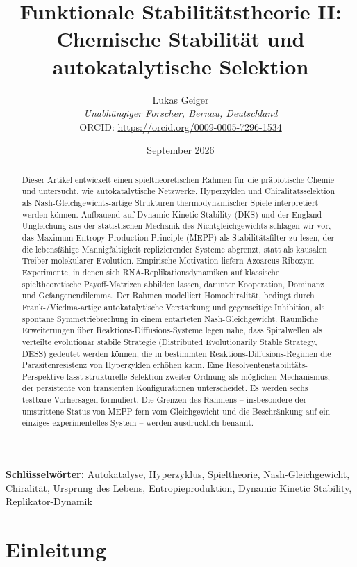 \documentclass[12pt,a4paper]{article}
\title{Funktionale Stabilitätstheorie II: Chemische Stabilität und autokatalytische Selektion}
\author{Lukas Geiger\\
\textit{Unabhängiger Forscher, Bernau, Deutschland}\\
ORCID: \url{https://orcid.org/0009-0005-7296-1534}}
\date{September 2026}
\theoremstyle{remark}
\begin{document}
\maketitle

\begin{abstract}
Dieser Artikel entwickelt einen spieltheoretischen Rahmen für die präbiotische Chemie und untersucht, wie autokatalytische Netzwerke, Hyperzyklen und Chiralitätsselektion als Nash-Gleichgewichts-artige Strukturen thermodynamischer Spiele interpretiert werden können. Aufbauend auf Dynamic Kinetic Stability (DKS) und der England-Ungleichung aus der statistischen Mechanik des Nichtgleichgewichts schlagen wir vor, das Maximum Entropy Production Principle (MEPP) als Stabilitätsfilter zu lesen, der die lebensfähige Mannigfaltigkeit replizierender Systeme abgrenzt, statt als kausalen Treiber molekularer Evolution. Empirische Motivation liefern Azoarcus-Ribozym-Experimente, in denen sich RNA-Replikationsdynamiken auf klassische spieltheoretische Payoff-Matrizen abbilden lassen, darunter Kooperation, Dominanz und Gefangenendilemma. Der Rahmen modelliert Homochiralität, bedingt durch Frank-/Viedma-artige autokatalytische Verstärkung und gegenseitige Inhibition, als spontane Symmetriebrechung in einem entarteten Nash-Gleichgewicht. Räumliche Erweiterungen über Reaktions-Diffusions-Systeme legen nahe, dass Spiralwellen als verteilte evolutionär stabile Strategie (Distributed Evolutionarily Stable Strategy, DESS) gedeutet werden können, die in bestimmten Reaktions-Diffusions-Regimen die Parasitenresistenz von Hyperzyklen erhöhen kann. Eine Resolventenstabilitäts-Perspektive fasst strukturelle Selektion zweiter Ordnung als möglichen Mechanismus, der persistente von transienten Konfigurationen unterscheidet. Es werden sechs testbare Vorhersagen formuliert. Die Grenzen des Rahmens -- insbesondere der umstrittene Status von MEPP fern vom Gleichgewicht und die Beschränkung auf ein einziges experimentelles System -- werden ausdrücklich benannt.
\end{abstract}

\textbf{Schlüsselwörter:} Autokatalyse, Hyperzyklus, Spieltheorie, Nash-Gleichgewicht, Chiralität, Ursprung des Lebens, Entropieproduktion, Dynamic Kinetic Stability, Replikator-Dynamik

\clearpage

\tableofcontents

\clearpage

\section{Einleitung}
\label{sec:introduction}
\end{document}
